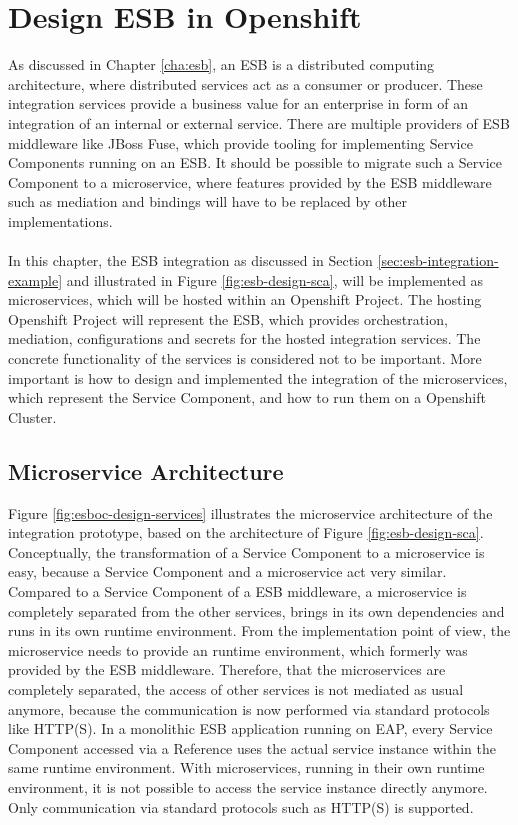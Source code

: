 \chapter{Design ESB in Openshift}
\label{cha:esboc}
As discussed in Chapter \vref{cha:esb}, an ESB is a distributed computing architecture, where distributed services act as a consumer or producer. These integration services provide a business value for an enterprise in form of an integration of an internal or external service. There are multiple providers of ESB middleware like JBoss Fuse, which provide tooling for implementing Service Components running on an ESB. It should be possible to migrate such a Service Component to a microservice, where features provided by the ESB middleware such as mediation and bindings will have to be replaced by other implementations.
\\ \\
In this chapter, the ESB integration as discussed in Section \vref{sec:esb-integration-example} and illustrated in Figure \vref{fig:esb-design-sca}, will be implemented as microservices, which will be hosted within an Openshift Project. The hosting Openshift Project will represent the ESB, which provides orchestration, mediation, configurations and secrets for the hosted integration services. The concrete functionality of the services is considered not to be important. More important is how to design and implemented the integration of the microservices, which represent the Service Component, and how to run them on a Openshift Cluster.

\section{Microservice Architecture}
Figure \vref{fig:esboc-design-services} illustrates the microservice architecture of the integration prototype, based on the architecture of Figure \vref{fig:esb-design-sca}. Conceptually, the transformation of a Service Component to a microservice is easy, because a Service Component and a microservice act very similar. Compared to a Service Component of a ESB middleware, a microservice is completely separated from the other services, brings in its own dependencies and runs in its own runtime environment. From the implementation point of view, the microservice needs to provide an runtime environment, which formerly was provided by the ESB middleware. Therefore, that the microservices are completely separated, the access of other services is not mediated as usual anymore, because the communication is now performed via standard protocols like HTTP(S). In a monolithic ESB application running on EAP, every Service Component accessed via a Reference uses the actual service instance within the same runtime environment. With microservices, running in their own runtime environment, it is not possible to access the service instance directly anymore. Only communication via standard protocols such as HTTP(S) is supported.

